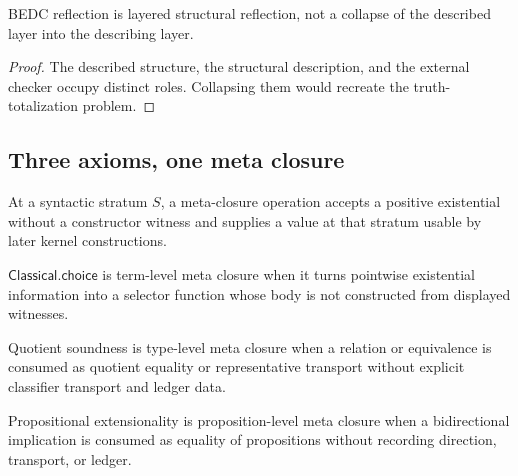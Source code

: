 \begin{corollary}
\label{cor:philosophy-reflection-layered}
BEDC reflection is layered structural reflection, not a collapse of the
described layer into the describing layer.
\end{corollary}
\begin{proof}
The described structure, the structural description, and the external
checker occupy distinct roles. Collapsing them would recreate the
truth-totalization problem.
\end{proof}


\subsection{Three axioms, one meta closure}
\label{subsec:philosophy-three-axioms-one-meta-closure}

\begin{definition}
\label{def:philosophy-meta-closure-operation}
At a syntactic stratum \(S\), a meta-closure operation accepts a
positive existential without a constructor witness and supplies a value
at that stratum usable by later kernel constructions.
\end{definition}

\begin{definition}
\label{def:philosophy-choice-term-meta-closure}
\(\mathsf{Classical.choice}\) is term-level meta closure when it turns
pointwise existential information into a selector function whose body
is not constructed from displayed witnesses.
\end{definition}

\begin{definition}
\label{def:philosophy-quot-sound-type-meta-closure}
Quotient soundness is type-level meta closure when a relation or
equivalence is consumed as quotient equality or representative
transport without explicit classifier transport and ledger data.
\end{definition}

\begin{definition}
\label{def:philosophy-propext-proposition-meta-closure}
Propositional extensionality is proposition-level meta closure when a
bidirectional implication is consumed as equality of propositions
without recording direction, transport, or ledger.
\end{definition}

